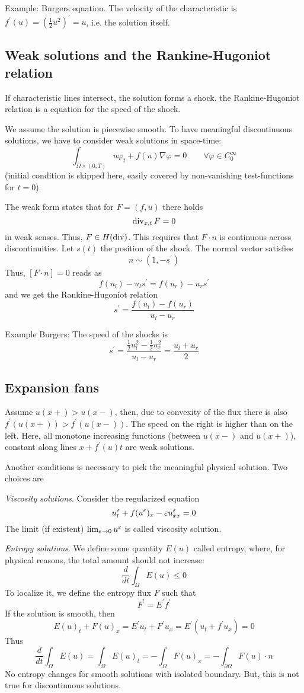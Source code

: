 Example: Burgers equation. The velocity of the characteristic is
$f^\prime(u) = (\tfrac{1}{2} u^2)^\prime = u$, i.e. the solution itself.

\subsection{Weak solutions and the Rankine-Hugoniot relation}
%
If characteristic lines intersect, the solution forms a shock. the
Rankine-Hugoniot relation is a equation for the speed of the shock. 

We assume the solution is piecewise smooth.
To have meaningful discontinuous solutions, we have to consider weak
solutions in space-time:
$$
\int_{\Omega \times (0,T)} u \varphi_t + f(u) \nabla \varphi = 0 \qquad
\forall \varphi \in C_0^\infty 
$$
(initial condition is skipped here, easily covered by non-vanishing
test-functions for $t=0$).

The weak form states that for $F = (f, u)$ there holds 
$$
\operatorname{div}_{x,t} F = 0 
$$
in weak senses. Thus, $F \in H(\operatorname{div})$.  This requires that $F \cdot
n$ is continuous across discontinuities. Let $s(t)$ the position
of the shock. The normal vector satisfies
$$
n \sim (1, -s^\prime)
$$
Thus, $[F \cdot n] = 0$ reads as
$$
f(u_l) - u_l s^\prime = f(u_r) - u_r s^\prime
$$
and we get the Rankine-Hugoniot relation
$$
s^\prime = \frac{f(u_l) - f(u_r)}{u_l - u_r} 
$$

Example Burgers: The speed of the shocks is
$$
s^\prime = \frac{ \tfrac{1}{2} u_l^2 - \tfrac{1}{2} u_r^2}  {u_l -
  u_r} = \frac{u_l + u_r}{2}
$$

\subsection{Expansion fans}
Assume $u(x+) > u(x-)$, then, due to convexity of the flux there is
also $f^\prime(u(x+)) > f^\prime(u(x-))$.
The speed on the right is higher than on the left. Here, all
monotone increasing functions (between $u(x-)$ and $u(x+)$), 
constant along lines $x + f^\prime(u) t$ are weak solutions.

Another conditions is necessary to pick the meaningful physical
solution. Two choices are

{\em Viscosity solutions}. Consider the regularized equation
$$
u_t^{\varepsilon} + f(u^{\varepsilon})_x - \varepsilon u_{xx}^{\varepsilon}= 0
$$
The limit (if existent)  $\lim_{\varepsilon \rightarrow 0} u^\varepsilon$ is called
viscosity solution.

{\em Entropy solutions}. We define some quantity $E(u)$ called
entropy, where, for physical reasons, the total amount should not
increase:
$$
\frac{d}{dt} \int_\Omega E(u) \leq 0 
$$
To localize it, we define the entropy flux $F$ such that
$$
F^\prime = E^\prime f^\prime
$$
If the solution is smooth, then
$$
E(u)_t + F(u)_x = E^\prime u_t + F^\prime u_x = E^\prime ( u_t +
f^\prime u_x) = 0
$$
Thus
$$
\frac{d}{dt} \int_{\Omega} E(u) = \int_\Omega E(u)_t = -\int_\Omega
F(u)_x = -\int_{\partial \Omega} F(u) \cdot n
$$
No entropy changes for smooth solutions with isolated boundary.  But,
this is not true for discontinuous solutions. 

